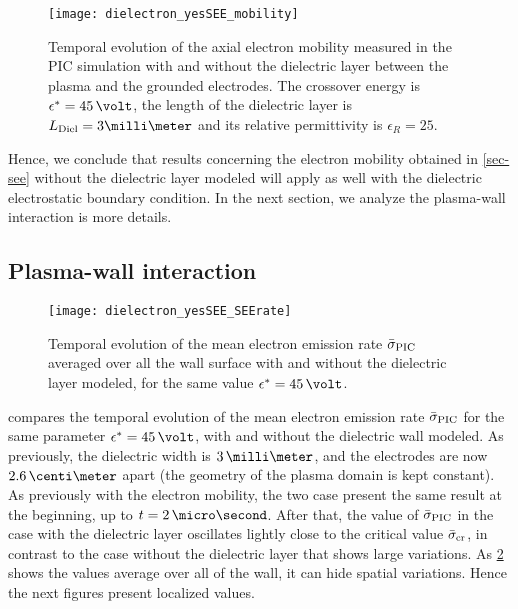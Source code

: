     \begin{figure}[hbt]
      \centering
      \texttt{[image: dielectron\_yesSEE\_mobility]}
      \caption{Temporal evolution of the axial electron mobility measured in the \acs{PIC} simulation with and without the dielectric layer between the plasma and the grounded electrodes. The crossover energy is $\crover=45\,\volt$, the length of the dielectric layer is $L_{\rm Diel}=3\milli\meter$ and its relative permittivity is $\epsilon_R = 25$.  }
      \label{fig-temporal_mu} 
    \end{figure}
    
    Hence, we conclude that results concerning the electron mobility obtained in \cref{sec-see} without the dielectric layer modeled will apply as well with the dielectric electrostatic boundary condition.
    In the next section, we analyze the plasma-wall interaction is more details.
    
  \subsection{Plasma-wall interaction}

  \begin{figure}[hbt]
    \centering
    \texttt{[image: dielectron\_yesSEE\_SEErate]}
    \caption{Temporal evolution of the mean electron emission rate $ \bar{\sigma }_{\rm PIC}$ averaged over all the wall surface with and without the dielectric layer modeled, for the same value $\crover=45\,\volt$.}
    \label{fig-rso_diel}
  \end{figure}
  
   compares the temporal evolution of the mean electron emission rate $ \bar{\sigma }_{\rm PIC}$ for the same parameter $\crover=45\,\volt$, with and without the dielectric wall modeled.
  As previously, the dielectric width is $3\,\milli\meter$, and the electrodes are now $2.6\,\centi\meter$ apart (the geometry of the plasma domain is kept constant).
  As previously with the electron mobility, the two case present the same result at the beginning, up to $t=2\,\micro\second$.
  After that, the value of $ \bar{\sigma }_{\rm PIC}$ in the case with the dielectric layer oscillates lightly close to the critical value $ \bar{\sigma }_{\rm cr}$, in contrast to the case without the dielectric layer that shows large variations.
  As \cref{fig-rso_diel} shows the values average over all of the wall, it can hide spatial variations.
  Hence the next figures present localized values.
  
